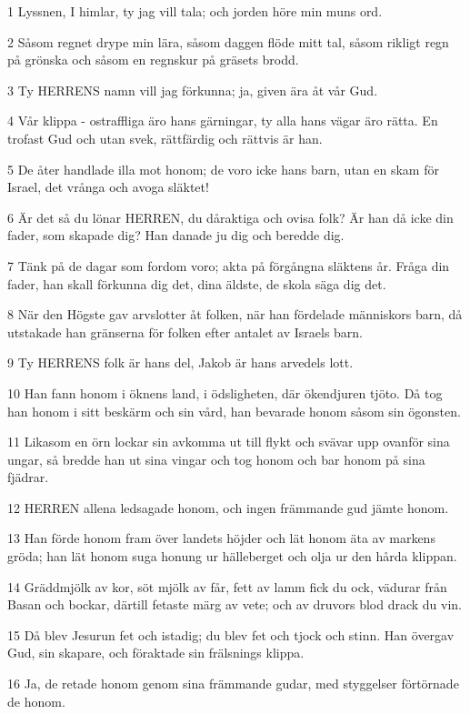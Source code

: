 \par 1 Lyssnen, I himlar, ty jag vill tala; och jorden höre min muns ord.
\par 2 Såsom regnet drype min lära, såsom daggen flöde mitt tal, såsom rikligt regn på grönska och såsom en regnskur på gräsets brodd.
\par 3 Ty HERRENS namn vill jag förkunna; ja, given ära åt vår Gud.
\par 4 Vår klippa - ostraffliga äro hans gärningar, ty alla hans vägar äro rätta. En trofast Gud och utan svek, rättfärdig och rättvis är han.
\par 5 De åter handlade illa mot honom; de voro icke hans barn, utan en skam för Israel, det vrånga och avoga släktet!
\par 6 Är det så du lönar HERREN, du dåraktiga och ovisa folk? Är han då icke din fader, som skapade dig? Han danade ju dig och beredde dig.
\par 7 Tänk på de dagar som fordom voro; akta på förgångna släktens år. Fråga din fader, han skall förkunna dig det, dina äldste, de skola säga dig det.
\par 8 När den Högste gav arvslotter åt folken, när han fördelade människors barn, då utstakade han gränserna för folken efter antalet av Israels barn.
\par 9 Ty HERRENS folk är hans del, Jakob är hans arvedels lott.
\par 10 Han fann honom i öknens land, i ödsligheten, där ökendjuren tjöto. Då tog han honom i sitt beskärm och sin vård, han bevarade honom såsom sin ögonsten.
\par 11 Likasom en örn lockar sin avkomma ut till flykt och svävar upp ovanför sina ungar, så bredde han ut sina vingar och tog honom och bar honom på sina fjädrar.
\par 12 HERREN allena ledsagade honom, och ingen främmande gud jämte honom.
\par 13 Han förde honom fram över landets höjder och lät honom äta av markens gröda; han lät honom suga honung ur hälleberget och olja ur den hårda klippan.
\par 14 Gräddmjölk av kor, söt mjölk av får, fett av lamm fick du ock, vädurar från Basan och bockar, därtill fetaste märg av vete; och av druvors blod drack du vin.
\par 15 Då blev Jesurun fet och istadig; du blev fet och tjock och stinn. Han övergav Gud, sin skapare, och föraktade sin frälsnings klippa.
\par 16 Ja, de retade honom genom sina främmande gudar, med styggelser förtörnade de honom.
